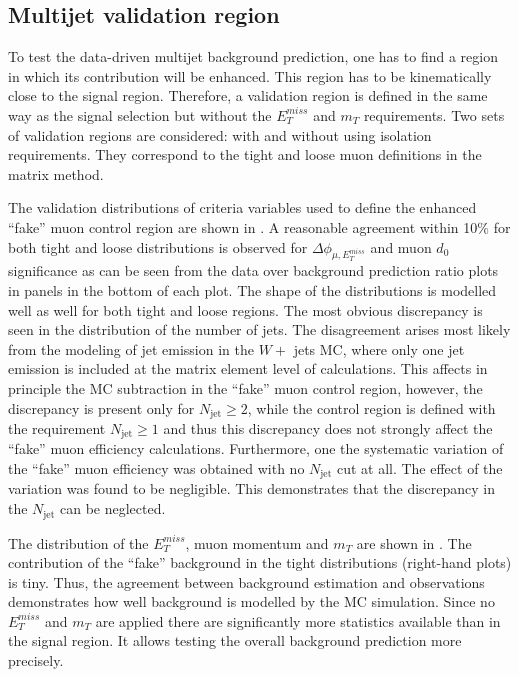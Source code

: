 \subsection{Multijet validation region}

To test the data-driven multijet background prediction, one has to find a region in which its contribution will be enhanced. 
This region has to be kinematically close to the signal region.
Therefore, a validation region is defined in the same way as the signal selection but without the $E_T^{miss}$ and $m_T$ requirements. 
Two sets of validation regions are considered: with and without using isolation requirements. They correspond to the tight and loose muon definitions in the matrix method.

The validation distributions of criteria variables used to define the enhanced ``fake'' muon control region are shown in .
A reasonable agreement within 10$\%$ for both tight and loose distributions is observed for $\Delta\phi_{\mu,E_T^{miss}}$ and muon $d_0$ significance as can be seen from the data over background prediction ratio plots in panels in the bottom of each plot. The shape of the distributions is modelled well as well for both tight and loose regions.
The most obvious discrepancy is seen in the
distribution of the number of jets. The disagreement arises most likely from the modeling of jet emission in the $W +$ jets MC, where only one jet emission is included at the
matrix element level of calculations.
This affects in principle the MC subtraction in the ``fake'' muon control region,
however, the discrepancy is present only for $N_\mathrm{jet}\geq2$, while the control region is 
defined with the requirement $N_\mathrm{jet}\geq1$ and thus this discrepancy does not strongly affect the ``fake'' muon efficiency calculations.
Furthermore, one the systematic variation of the ``fake'' muon efficiency was obtained with no $N_\mathrm{jet}$ cut at all. The effect of the variation was found to be negligible. This demonstrates that the discrepancy in the $N_\mathrm{jet}$ can be neglected.

The distribution of the $E_T^{miss}$, muon momentum and $m_T$ are shown in .
The contribution of the ``fake'' background in the tight distributions (right-hand plots) is tiny. Thus, the agreement between background estimation and observations demonstrates how well background is modelled by the MC simulation.
Since no $E_T^{miss}$ and $m_T$ are applied there are significantly more statistics available than in the signal region. It allows testing the overall background prediction more precisely.

